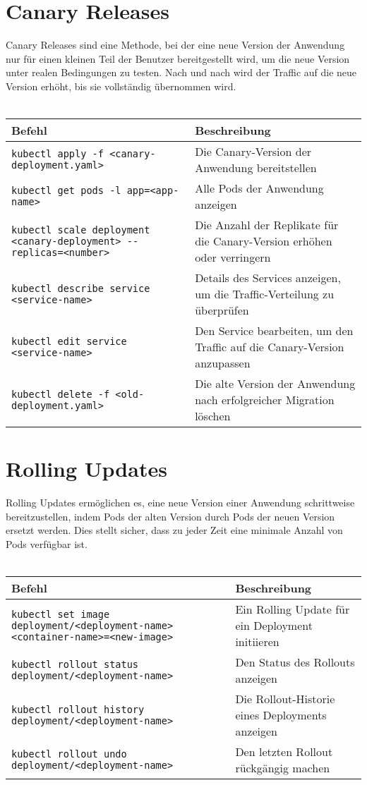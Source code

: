 \section{Canary Releases}
Canary Releases sind eine Methode, bei der eine neue Version der Anwendung nur für einen kleinen Teil der Benutzer bereitgestellt wird, um die neue Version unter realen Bedingungen zu testen. Nach und nach wird der Traffic auf die neue Version erhöht, bis sie vollständig übernommen wird.\\
\phantom{.}\\
\begin{tabular}{|p{}|p{}|}
\hline
\textbf{Befehl} & \textbf{Beschreibung} \\
\hline
\texttt{kubectl apply -f <canary-deployment.yaml>} & Die Canary-Version der Anwendung bereitstellen \\
\texttt{kubectl get pods -l app=<app-name>} & Alle Pods der Anwendung anzeigen \\
\texttt{kubectl scale deployment <canary-deployment> {-}{-}replicas=<number>} & Die Anzahl der Replikate für die Canary-Version erhöhen oder verringern \\
\texttt{kubectl describe service <service-name>} & Details des Services anzeigen, um die Traffic-Verteilung zu überprüfen \\
\texttt{kubectl edit service <service-name>} & Den Service bearbeiten, um den Traffic auf die Canary-Version anzupassen \\
\texttt{kubectl delete -f <old-deployment.yaml>} & Die alte Version der Anwendung nach erfolgreicher Migration löschen \\
\hline
\end{tabular}

\section{Rolling Updates}
Rolling Updates ermöglichen es, eine neue Version einer Anwendung schrittweise bereitzustellen, indem Pods der alten Version durch Pods der neuen Version ersetzt werden. Dies stellt sicher, dass zu jeder Zeit eine minimale Anzahl von Pods verfügbar ist.\\
\phantom{.}\\
\begin{tabular}{|p{}|p{}|}
\hline
\textbf{Befehl} & \textbf{Beschreibung} \\
\hline
\texttt{kubectl set image deployment/<deployment-name> <container-name>=<new-image>} & Ein Rolling Update für ein Deployment initiieren \\
\texttt{kubectl rollout status deployment/<deployment-name>} & Den Status des Rollouts anzeigen \\
\texttt{kubectl rollout history deployment/<deployment-name>} & Die Rollout-Historie eines Deployments anzeigen \\
\texttt{kubectl rollout undo deployment/<deployment-name>} & Den letzten Rollout rückgängig machen \\
\hline
\end{tabular}
\newpage
